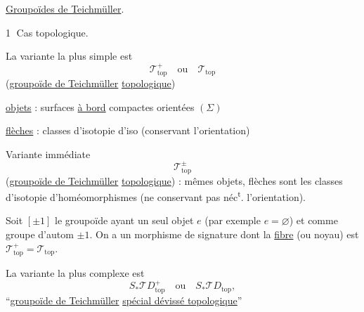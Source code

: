 \uline{Groupoïdes de Teichmüller}.

\textcircled{1} Cas topologique.

La variante la plus simple est
\[
\mathcal T^+_{\mathrm{top}}\quad\text{ou}\quad\mathcal T_{\mathrm{top}}
\]
(\uline{groupoïde de Teichmüller}  \uline{topologique})

\uline{objets} : surfaces \uline{à bord} compactes orientées $(\Sigma)$

\uline{flèches} : classes d'isotopie d'iso (conservant l'orientation)


Variante immédiate
\[
\mathcal T_{\mathrm{top}}^\pm
\]
(\uline{groupoïde de Teichmüller}  \uline{topologique}) :
mêmes objets, flèches sont les classes d'isotopie d'homéomorphismes
(ne conservant pas néc\textsuperscript{t}. l'orientation).

Soit $[\pm1]$ le groupoïde ayant un seul objet $e$ (par exemple $e=\varnothing$)
et comme groupe d'autom $\pm1$. On a un morphisme de signature
dont la \uline{fibre}  (ou noyau) est
$\mathcal T_{\mathrm{top}}^+=\mathcal T_{\mathrm{top}}$.

La variante la plus complexe est
\[
S_*\mathcal TD_{\mathrm{top}}^+\quad\text{ou}\quad
S_*\mathcal TD_{\mathrm{top}},
\]
``\uline{groupoïde de Teichmüller} 
\uline{spécial dévissé topologique}''
